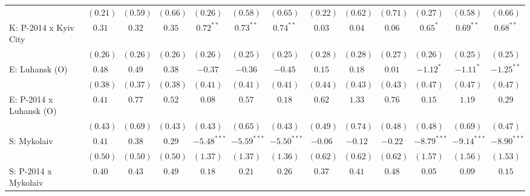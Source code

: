 \begin{table}
\begin{center}
\begin{tiny}
\begin{tabular}{l c c c c c c c c c c c c}
                            & $(0.21)$      & $(0.59)$     & $(0.66)$      & $(0.26)$       & $(0.58)$       & $(0.65)$       & $(0.22)$      & $(0.62)$    & $(0.71)$       & $(0.27)$       & $(0.58)$       & $(0.66)$       \\
K: P-2014 x Kyiv City       & $0.31$        & $0.32$       & $0.35$        & $0.72^{**}$    & $0.73^{**}$    & $0.74^{**}$    & $0.03$        & $0.04$      & $0.06$         & $0.65^{*}$     & $0.69^{**}$    & $0.68^{**}$    \\
                            & $(0.26)$      & $(0.26)$     & $(0.26)$      & $(0.26)$       & $(0.25)$       & $(0.25)$       & $(0.28)$      & $(0.28)$    & $(0.27)$       & $(0.26)$       & $(0.25)$       & $(0.25)$       \\
E: Luhansk (O)              & $0.48$        & $0.49$       & $0.38$        & $-0.37$        & $-0.36$        & $-0.45$        & $0.15$        & $0.18$      & $0.01$         & $-1.12^{*}$    & $-1.11^{*}$    & $-1.25^{**}$   \\
                            & $(0.38)$      & $(0.37)$     & $(0.38)$      & $(0.41)$       & $(0.41)$       & $(0.41)$       & $(0.44)$      & $(0.43)$    & $(0.43)$       & $(0.47)$       & $(0.47)$       & $(0.47)$       \\
E: P-2014 x Luhansk (O)     & $0.41$        & $0.77$       & $0.52$        & $0.08$         & $0.57$         & $0.18$         & $0.62$        & $1.33$      & $0.76$         & $0.15$         & $1.19$         & $0.29$         \\
                            & $(0.43)$      & $(0.69)$     & $(0.43)$      & $(0.43)$       & $(0.65)$       & $(0.43)$       & $(0.49)$      & $(0.74)$    & $(0.48)$       & $(0.48)$       & $(0.69)$       & $(0.47)$       \\
S: Mykolaiv                 & $0.41$        & $0.38$       & $0.29$        & $-5.48^{***}$  & $-5.59^{***}$  & $-5.50^{***}$  & $-0.06$       & $-0.12$     & $-0.22$        & $-8.79^{***}$  & $-9.14^{***}$  & $-8.90^{***}$  \\
                            & $(0.50)$      & $(0.50)$     & $(0.50)$      & $(1.37)$       & $(1.37)$       & $(1.36)$       & $(0.62)$      & $(0.62)$    & $(0.62)$       & $(1.57)$       & $(1.56)$       & $(1.53)$       \\
S: P-2014 x Mykolaiv        & $0.40$        & $0.43$       & $0.49$        & $0.18$         & $0.21$         & $0.26$         & $0.37$        & $0.41$      & $0.48$         & $0.05$         & $0.09$         & $0.15$         \\

\end{tabular}
\end{tiny}
\end{center}
\end{table}
